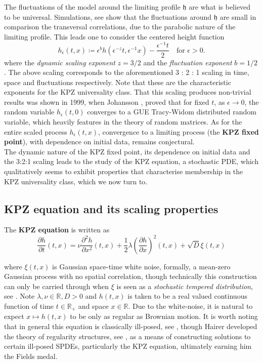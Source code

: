 \documentclass[12pt]{report}
\theoremstyle{plain}
\newcommand{\R}{\ensuremath{\mathbb{R}}}
\begin{document}
The fluctuations of the model around the limiting profile \(\mathfrak h\) are what is believed to be universal. Simulations, see \cite{corwin2016kardar} show that the fluctuations around \(\mathfrak h\) are small in comparison the transversal correlations, due to the parabolic nature of the limiting profile. This leads one to consider the centered height function 
\[
h_{\epsilon}(t,x)\coloneqq  \epsilon^bh(\epsilon^{-z}t, \epsilon^{-1}x)-\frac{\epsilon^{-1}t}{2} \quad \text{for } \epsilon>0.
\]
\noindent where the \textit{dynamic scaling exponent} \(z = 3/2\) and the \textit{fluctuation exponent} \(b = 1/2\). The above scaling corresponds to the aforementioned 3 :
2 : 1 scaling in time, space and fluctuations respectively. Note that these are the characteristic exponents for the KPZ universality class. That this scaling produces non-trivial results was shown in 1999, when Johansson \cite{johansson2000shape}, proved that for fixed \(t\), as \(\epsilon \to 0\), the random
variable \(h_{\epsilon}(t,0)\) converges to a GUE Tracy-Widom distributed random variable, which heavily features in the theory of random matrices. As for the entire scaled process \(h_{\epsilon}(t, x)\), convergence to a limiting process (the \textbf{KPZ fixed point}), with dependence on initial data, remains conjectural.\\

The dynamic nature of the KPZ fixed point, its dependence on initial data and the 3:2:1 scaling leads to the study of the KPZ equation, a stochastic PDE, which qualitatively seems to exhibit properties that characterise membership in the KPZ universality class, which we now turn to.

\subsection{KPZ equation and its scaling properties}
The \textbf{KPZ equation} is written as
\begin{equation}\label{eq: KPZ eqn}
    \frac{\partial h}{\partial t}(t,x) = \nu\frac{\partial^2 h}{\partial x^2}(t,x)+\frac{1}{2}\lambda \left(\frac{\partial h}{\partial x}\right)^2(t,x)+\sqrt{D}\xi(t,x)
\end{equation}

\noindent where \(\xi(t, x)\) is Gaussian space-time white noise, formally, a mean-zero Gaussian process with no spatial correlation, though technically this construction can only be carried through when \(\xi\) is seen as a \textit{stochastic tempered distribution}, see \cite{streit1994introduction}. Note \(\lambda, \nu \in \R, D > 0\) and \(h(t, x)\) is taken to be a real valued continuous function of time \(t \in \R_{+}\) and space \(x \in \R\). Due to the white-noise, it is natural to expect \(x \mapsto h(t, x)\) to be only as regular as Brownian motion. It is worth noting that in general this equation is classically ill-posed, see \cite{quastel2011introduction}, though Hairer developed the theory of regularity structures, see \cite{hairer2014theory}, as a means of constructing solutions to certain ill-posed SPDEs, particularly the KPZ equation, ultimately earning him the Fields medal.\\
\end{document}

